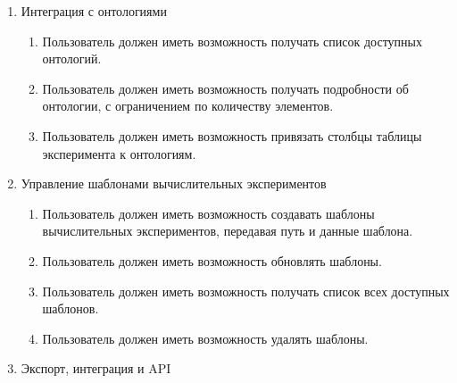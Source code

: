 \documentclass[a4paper,12pt,reqno]{article}
\begin{document}
\begin{enumerate}
        \item Интеграция с онтологиями

        \begin{enumerate}[label=\arabic{enumi}.\arabic*.]
            \item Пользователь должен иметь возможность получать список доступных онтологий.
            \item Пользователь должен иметь возможность получать подробности об онтологии, с ограничением по количеству элементов.
            \item Пользователь должен иметь возможность привязать столбцы таблицы эксперимента к онтологиям.
        \end{enumerate}

        \item Управление шаблонами вычислительных экспериментов

        \begin{enumerate}[label=\arabic{enumi}.\arabic*.]
            \item Пользователь должен иметь возможность создавать шаблоны вычислительных экспериментов, передавая путь и данные шаблона.
            \item Пользователь должен иметь возможность обновлять шаблоны.
            \item Пользователь должен иметь возможность получать список всех доступных шаблонов.
            \item Пользователь должен иметь возможность удалять шаблоны.
        \end{enumerate}

        \item Экспорт, интеграция и API


\end{enumerate}
\end{document}
